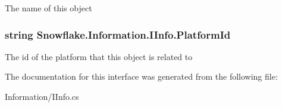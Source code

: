 The name of this object 

\hypertarget{interface_snowflake_1_1_information_1_1_i_info_adbca5b9f2db24b233866de3304500088}{}
\subsubsection[{Platform\+Id}]{\setlength{\rightskip}{0pt plus 5cm}string Snowflake.\+Information.\+I\+Info.\+Platform\+Id\hspace{0.3cm}{\ttfamily [get]}}\label{interface_snowflake_1_1_information_1_1_i_info_adbca5b9f2db24b233866de3304500088}


The id of the platform that this object is related to 



The documentation for this interface was generated from the following file\+:\begin{DoxyCompactItemize}
\item 
Information/I\+Info.\+cs\end{DoxyCompactItemize}
